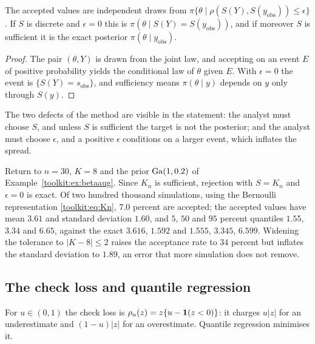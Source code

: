 \begin{proposition}\label{toolkit:prop:abc}
The accepted values are independent draws from
$\pi\{\theta\mid\rho(S(Y),S(y_{\mathrm{obs}}))\le\epsilon\}$. If $S$ is discrete and $\epsilon=0$
this is $\pi(\theta\mid S(Y)=S(y_{\mathrm{obs}}))$, and if moreover $S$ is sufficient it is the exact
posterior $\pi(\theta\mid y_{\mathrm{obs}})$.
\end{proposition}

\begin{proof}
The pair $(\theta,Y)$ is drawn from the joint law, and accepting on an event $E$ of positive
probability yields the conditional law of $\theta$ given $E$. With $\epsilon=0$ the event is
$\{S(Y)=s_{\mathrm{obs}}\}$, and sufficiency means $\pi(\theta\mid y)$ depends on $y$ only through
$S(y)$.
\end{proof}

The two defects of the method are visible in the statement: the analyst must choose $S$, and
unless $S$ is sufficient the target is not the posterior; and the analyst must choose $\epsilon$,
and a positive $\epsilon$ conditions on a larger event, which inflates the spread.

\begin{example}\label{toolkit:ex:abc}
Return to $n=30$, $K=8$ and the prior $\mathrm{Ga}(1,0.2)$ of Example~\ref{toolkit:ex:betaaug}. Since $K_n$
is sufficient, rejection with $S=K_n$ and $\epsilon=0$ is exact. Of two hundred thousand
simulations, using the Bernoulli representation \eqref{toolkit:eq:Kn}, $7.0$ percent are accepted;
the accepted values have mean $3.61$ and standard deviation $1.60$, and $5$, $50$ and $95$
percent quantiles $1.55$, $3.34$ and $6.65$, against the exact $3.616$, $1.592$ and $1.555$,
$3.345$, $6.599$. Widening the tolerance to $|K-8|\le2$ raises the acceptance rate to $34$ percent
but inflates the standard deviation to $1.89$, an error that more simulation does not remove.
\end{example}

\subsection{The check loss and quantile regression}\label{toolkit:sec:check}

For $u\in(0,1)$ the check loss is $\rho_u(z)=z\{u-\mathbf{1}(z<0)\}$: it charges $u|z|$ for an
underestimate and $(1-u)|z|$ for an overestimate. Quantile regression \citep{toolkit:koenker1978}
minimises it.

